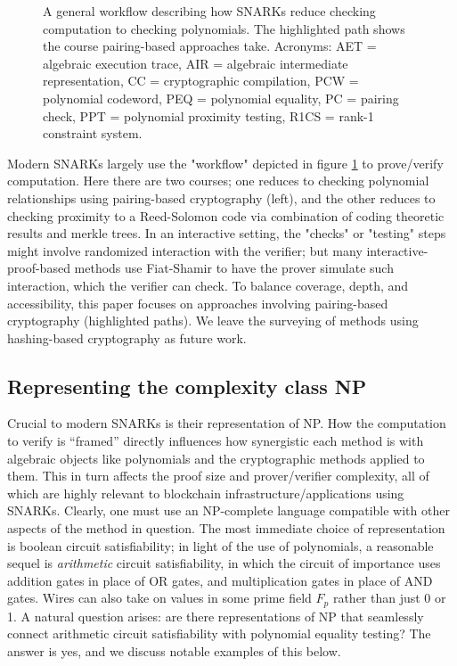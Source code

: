\begin{figure}[htbp]
    \caption{A general workflow describing how SNARKs reduce checking computation to checking polynomials. The highlighted path shows the course pairing-based approaches take. Acronyms: AET = algebraic execution trace, AIR = algebraic intermediate representation, CC = cryptographic compilation, PCW = polynomial codeword, PEQ = polynomial equality, PC = pairing check, PPT = polynomial proximity testing, R1CS = rank-1 constraint system.}
    \label{fig:snark-workflow}
\end{figure}
\noindent Modern SNARKs largely use the "workflow" depicted in figure \ref{fig:snark-workflow} to prove/verify computation. Here there are two courses; one reduces to checking polynomial relationships using pairing-based cryptography (left), and the other reduces to checking proximity to a Reed-Solomon code via combination of coding theoretic results and merkle trees. In an interactive setting, the "checks" or "testing" steps might involve randomized interaction with the verifier; but many interactive-proof-based methods use Fiat-Shamir to have the prover simulate such interaction, which the verifier can check. To balance coverage, depth, and accessibility, this paper focuses on approaches involving pairing-based cryptography (highlighted paths). We leave the surveying of methods using hashing-based cryptography as future work.

\subsection{Representing the complexity class NP}
\noindent Crucial to modern SNARKs is their representation of NP. How the computation to verify is ``framed'' directly influences how synergistic each method is with algebraic objects like polynomials and the cryptographic methods applied to them. This in turn affects the proof size and prover/verifier complexity, all of which are highly relevant to blockchain infrastructure/applications using SNARKs. Clearly, one must use an NP-complete language compatible with other aspects of the method in question. The most immediate choice of representation is boolean circuit satisfiability; in light of the use of polynomials, a reasonable sequel is \textit{arithmetic} circuit satisfiability, in which the circuit of importance uses addition gates in place of OR gates, and multiplication gates in place of AND gates. Wires can also take on values in some prime field $F_p$  rather than just 0 or 1. A natural question arises: are there representations of NP that seamlessly connect arithmetic circuit satisfiability with polynomial equality testing? The answer is yes, and we discuss notable examples of this below.

